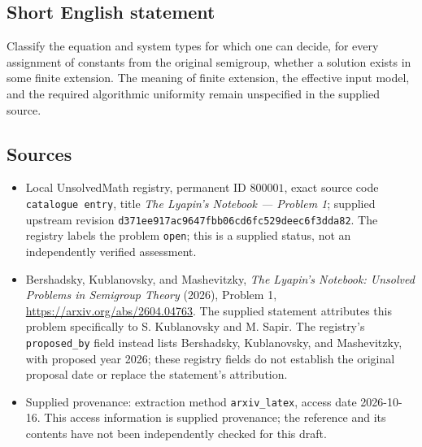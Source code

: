 \documentclass[11pt]{article}
\begin{document}
\subsection{Short English statement}
Classify the equation and system types for which one can decide, for every assignment of constants from the original semigroup, whether a solution exists in some finite extension. The meaning of finite extension, the effective input model, and the required algorithmic uniformity remain unspecified in the supplied source.
\subsection{Sources}
\begin{itemize}
\item Local UnsolvedMath registry, permanent ID \(800001\), exact source code \texttt{catalogue entry}, title \emph{The Lyapin's Notebook --- Problem 1}; supplied upstream revision \texttt{d371ee917ac9647fbb06cd6fc529deec6f3dda82}. The registry labels the problem \texttt{open}; this is a supplied status, not an independently verified assessment.
\item Bershadsky, Kublanovsky, and Mashevitzky, \emph{The Lyapin's Notebook: Unsolved Problems in Semigroup Theory} (2026), Problem 1, \url{https://arxiv.org/abs/2604.04763}. The supplied statement attributes this problem specifically to S. Kublanovsky and M. Sapir. The registry's \texttt{proposed\_by} field instead lists Bershadsky, Kublanovsky, and Mashevitzky, with proposed year 2026; these registry fields do not establish the original proposal date or replace the statement's attribution.
\item Supplied provenance: extraction method \texttt{arxiv\_latex}, access date 2026-10-16. This access information is supplied provenance; the reference and its contents have not been independently checked for this draft.
\end{itemize}
\end{document}
